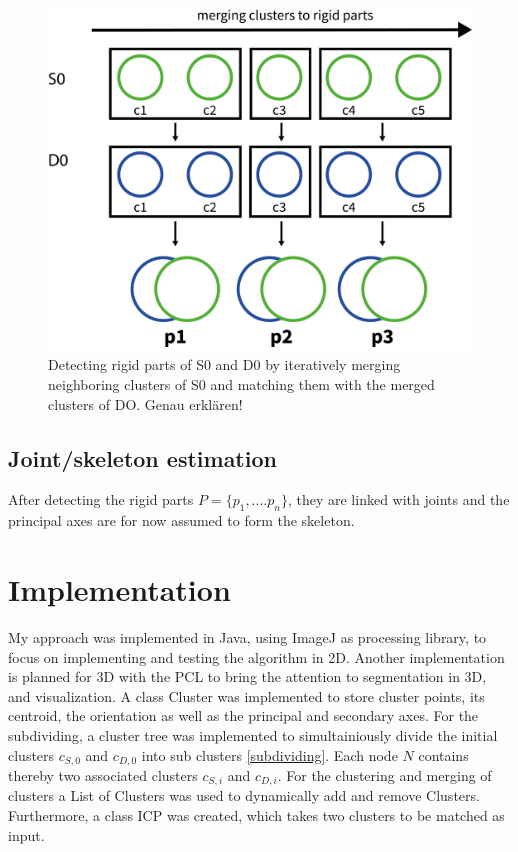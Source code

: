\documentclass[notitlepage,english]{report}
\begin{document}
\begin{figure}
	\centering
	\includegraphics[width=0.7\linewidth]{ClusterChain}
	\caption{Detecting rigid parts of S0 and D0 by iteratively merging neighboring clusters of S0 and matching them with the merged clusters of DO. Genau erklären! }
	\label{fig:clusterChain}
\end{figure}

\subsection{Joint/skeleton estimation}

After detecting the rigid parts $ P =  \{ {p_1,....p_n}\}$, they are linked with joints and the principal axes are for now assumed to form the skeleton. 

\section{Implementation}

My approach was implemented in Java, using ImageJ as processing library, to focus on implementing and testing the algorithm in 2D. Another implementation is planned for 3D with the PCL to bring the attention to segmentation in 3D, and visualization. A class Cluster was implemented to store cluster points, its centroid, the orientation as well as the principal and secondary axes. For the subdividing, a cluster tree was implemented to simultainiously divide the initial clusters $c_{S, 0}$ and $c_{D, 0}$ into sub clusters \ref{subdividing}. Each node $N$ contains thereby two associated clusters $c_{S, i}$ and $c_{D, i}$. For the clustering and merging of clusters a List of Clusters was used to dynamically add and remove Clusters. Furthermore, a class ICP was created, which takes two clusters to be matched as input.
\end{document}
